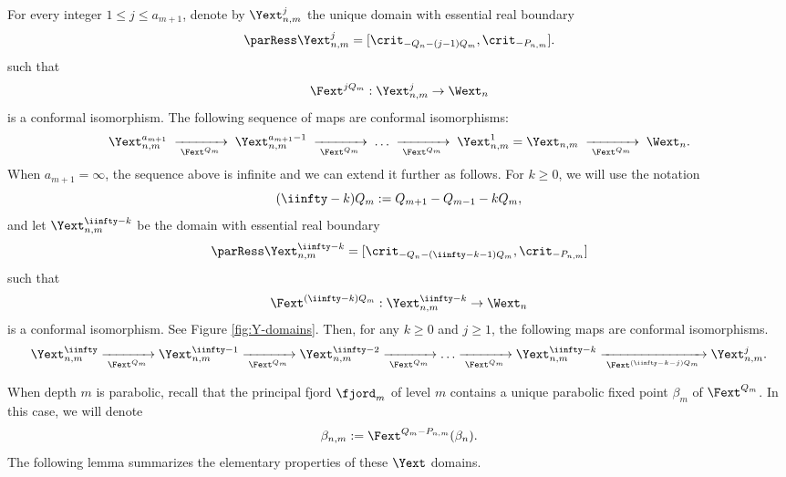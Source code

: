 \documentclass{amsart}
\begin{document}
For every integer $1\leq j \leq a_{m+1}$, denote by $\Yext^j_{n,m}$ the unique domain with essential real boundary
\[
\parRess \Yext^j_{n,m} = [\crit_{-Q_n-(j-1)Q_m},\crit_{-P_{n,m}}].
\]
such that 
\[
    \Fext^{jQ_m}: \Yext^j_{n,m} \to \Wext_n
\]
is a conformal isomorphism.
The following sequence of maps are conformal isomorphisms:
\[
    \Yext^{a_{m+1}}_{n,m} \; \xrightarrow[\;\Fext^{Q_m}\;]{} \; 
    \Yext^{a_{m+1}-1}_{n,m} \; \xrightarrow[\;\Fext^{Q_m}\;]{} \;
    \ldots \; \xrightarrow[\;\Fext^{Q_m}\;]{} \;
    \Yext^{1}_{n,m} = \Yext_{n,m} \; \xrightarrow[\;\Fext^{Q_m}\;]{} \; \Wext_n.
\]
When $a_{m+1}=\infty$, the sequence above is infinite and we can extend it further as follows. 
For $k \geq 0$, we will use the notation
\[
    (\iinfty-k)Q_m := Q_{m+1}-Q_{m-1}-kQ_m, 
\]
and let $\Yext^{\iinfty-k}_{n,m}$ be the domain with essential real boundary 
\[
    \parRess \Yext^{\iinfty-k}_{n,m} = [\crit_{-Q_n-(\iinfty-k-1)Q_m},\crit_{-P_{n,m}}]
\]
such that
\[
    \Fext^{(\iinfty-k)Q_m}: \Yext^{\iinfty-k}_{n,m} \to \Wext_n
\]
is a conformal isomorphism. 
See Figure \ref{fig:Y-domains}.
Then, for any $k \geq 0$ and $j \geq 1$, the following maps are conformal isomorphisms.
\[
    \Yext^{\iinfty}_{n,m} \xrightarrow[\;\Fext^{Q_m}\;]{} 
    \Yext^{\iinfty-1}_{n,m} \xrightarrow[\;\Fext^{Q_m}\;]{} 
    \Yext^{\iinfty-2}_{n,m} \xrightarrow[\;\Fext^{Q_m}\;]{} 
    \ldots \xrightarrow[\;\Fext^{Q_m}\;]{} 
    \Yext^{\iinfty-k}_{n,m} \xrightarrow[\;\Fext^{(\iinfty-k-j)Q_m}\;]{} 
    \Yext^{j}_{n,m}.
\]

When depth $m$ is parabolic, recall that the principal fjord $\fjord_m$ of level $m$ contains a unique parabolic fixed point $\beta_m$ of $\Fext^{Q_m}$.
In this case, we will denote
\[
    \beta_{n,m} := \Fext^{Q_m-P_{n,m}}(\beta_n).
\]
The following lemma summarizes the elementary properties of these $\Yext$ domains.
\end{document}
